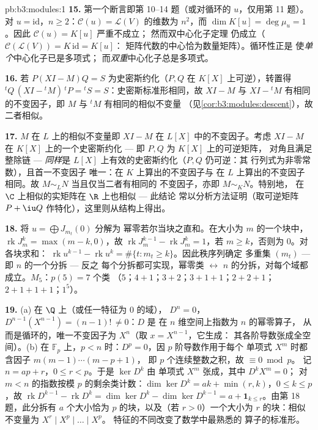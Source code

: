 \begin{solution}{pb:b3:modules:1}
\textbf{15.} 第一个断言即第 10--14 题（或对循环的
$u$，仅用第 11 题）。对 $u = \mathrm{id}$，$n \geq
2$：$\mathcal C(u) = \mathcal L(V)$ 的维数为 $n^2$，而
$\dim K[u] = \deg\mu_u = 1$。因此 $\mathcal C(u) = K[u]$ 严重不成立；
然而双中心化子定理
仍成立（$\mathcal C(\mathcal L(V)) = K\,\mathrm{id} = K[u]$：
矩阵代数的中心恰为数量矩阵）。循环性正是
使\emph{单个}中心化子已是多项式；
而\emph{双重}中心化子总是多项式。

\textbf{16.} 若 $P(XI - M)Q = S$ 为史密斯约化（$P, Q$
在 $K[X]$ 上可逆），转置得 ${}^tQ\,(XI -
{}^tM)\,{}^tP = {}^tS = S$：史密斯标准形相同，故 $XI - M$ 与
$XI - {}^tM$ 有相同的不变因子，即 $M$ 与
${}^tM$ 有相同的相似不变量
（见\cref{cor:b3:modules:descent}），故二者相似。

\textbf{17.} $M$ 在 $L$ 上的相似不变量即
$XI - M$ 在 $L[X]$ 中的不变因子。考虑
$XI - M$ 在 $K[X]$ 上的一个史密斯约化 --- 即 $P, Q$ 为 $K[X]$ 上的可逆矩阵，
对角且满足整除链 --- \emph{同样}是
$L[X]$ 上有效的史密斯约化（$P, Q$ 仍可逆：其
行列式为非零常数），且首一不变因子
唯一：在 $K$ 上算出的不变因子与
在 $L$ 上算出的不变因子相同。故 $M \sim_L N$ 当且仅当二者有相同的
不变因子，亦即 $M \sim_K N$。特别地，
在 $\C$ 上相似的实矩阵在 $\R$ 上也相似 --- 此结论
常以分析方法证明（取可逆矩阵 $P + \iu
Q$ 作特化），这里则从结构上得出。

\textbf{18.} 将 $u = \bigoplus J_{m_t}(0)$ 分解为
幂零若尔当块之直和。在大小为 $m$ 的一个块中，
$\operatorname{rk}J_m^k = \max(m - k, 0)$，故
$\operatorname{rk}J_m^{k-1} - \operatorname{rk}J_m^k = 1$，若 $m
\geq k$，否则为 $0$。对各块求和：
$\operatorname{rk}u^{k-1} - \operatorname{rk}u^k =
\#\{t : m_t \geq k\}$。因此秩序列确定
多重集 $(m_t)$ --- 即 $n$ 的一个分拆 --- 反之
每个分拆都可实现，幂零类 $\leftrightarrow$
$n$ 的分拆，对每个域都成立。$M_5$：$p(5) = 7$ 个类
（$5$；$4{+}1$；$3{+}2$；$3{+}1{+}1$；$2{+}2{+}1$；
$2{+}1{+}1{+}1$；$1^5$）。

\textbf{19.} (a) 在 $\Q$ 上（或任一特征为 $0$ 的域），
$D^n = 0$，$D^{n-1}(X^{n-1}) = (n-1)!\, \neq 0$：$D$ 是
在 $n$ 维空间上指数为 $n$ 的幂零算子，
从而是循环的，唯一不变因子为 $X^n$（取 $x = X^{n-1}$，它生成：
其各阶导数张成全空间）。(b) 在 $\mathbb F_p$ 上，$p
< n$ 时：$D^p = 0$，因 $p$ 阶导数作用于每个
单项式 $X^m$ 时都含因子 $m(m-1)\cdots(m-p+1)$，
即 $p$ 个连续整数之积，故 $\equiv 0 \bmod p$。
记 $n = ap + r$，$0 \leq r < p$。于是 $\ker D^k$ 由
单项式 $X^m$ 张成，其中 $D^kX^m = 0$；
对 $m < n$ 的指数按模 $p$ 的剩余类计数：$\dim\ker D^k = ak + \min(r,
k)$，$0 \leq k \leq p$，故 $\operatorname{rk}D^{k-1} -
\operatorname{rk}D^k = \dim\ker D^k - \dim\ker D^{k-1} = a +
\mathbf 1_{k \leq r}$。由第 18 题，此分拆有 $a$
个大小恰为 $p$ 的块，以及（若 $r > 0$）一个大小为
$r$ 的块：相似不变量为 $X^r \mid X^p \mid \dots \mid X^p$。
特征的不同改变了数学中最熟悉的
算子的标准形。


\end{solution}
